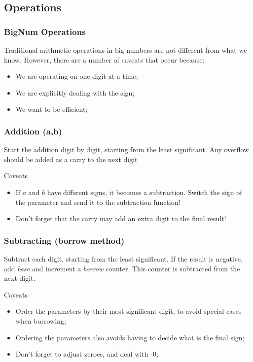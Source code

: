 \documentclass{beamer}
\begin{document}
\subsection{Operations}

\begin{frame}
  \frametitle{BigNum Operations} 

  Traditional arithmetic operations in big numbers are not different
  from what we know. However, there are a number of caveats that occur
  because:
  \begin{itemize}
  \item We are operating on one digit at a time;
  \item We are explicitly dealing with the sign;
  \item We want to be efficient;
  \end{itemize}
\end{frame}

\begin{frame}
  \frametitle{Addition (a,b)}
  
  Start the addition digit by digit, starting from the least
  significant. Any overflow should be added as a carry to the next
  digit

  \bigskip

  \begin{block}{Caveats}
    \begin{itemize}
    \item If $a$ and $b$ have different signs, it becomes a
      subtraction. Switch the sign of the parameter and send it to the
      subtraction function!
    \item Don't forget that the carry may add an extra digit to the
      final result!
    \end{itemize}
  \end{block}
\end{frame}

\begin{frame}
  \frametitle{Subtracting (borrow method)}
  
  Subtract each digit, starting from the least significant. If the
  result is negative, add \emph{base} and increment a \emph{borrow}
  counter. This counter is subtracted from the next digit.

  \bigskip

  \begin{block}{Caveats}
    \begin{itemize}
    \item Order the parameters by their most significant digit, to
      avoid special cases when borrowing;
    \item Ordering the parameters also avoids having to decide what is
      the final sign;
    \item Don't forget to adjust zeroes, and deal with -0;
    \end{itemize}
  \end{block}
\end{frame}
\end{document}
